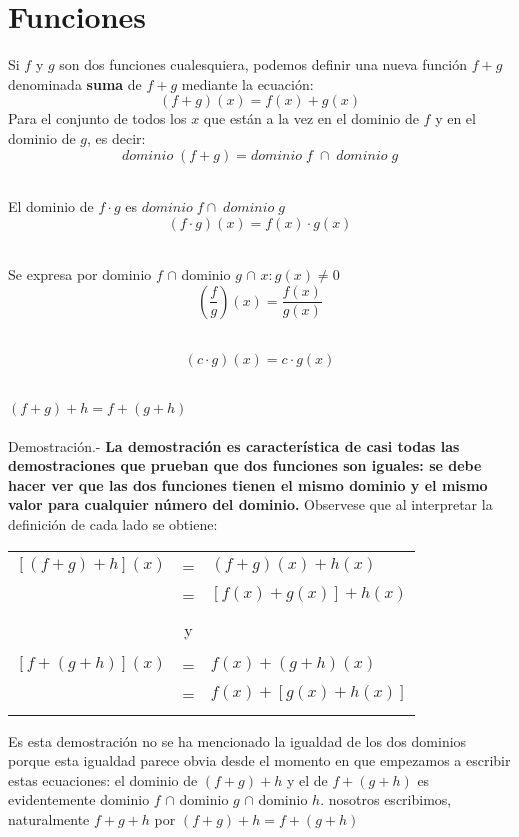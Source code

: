 \chapter{Funciones}
\begin{tcolorbox}
\begin{def.}
Si $f$ \; y \; $g$ son dos funciones cualesquiera, podemos definir una nueva función $f+g$ denominada \textbf{suma} de $f+g$ mediante la ecuación:
$$(f+g)(x)=f(x)+g(x)$$
Para el conjunto de todos los $x$ que están a la vez en el dominio de $f$ y en el dominio de $g$, es decir: $$dominio \; (f+g)=dominio \; f \; \cap \; dominio \; g$$\\
\end{def.}
\begin{def.}
El dominio de $f \cdot g$ es $dominio \; f \cap \; dominio \; g$ $$(f \cdot g)(x)=f(x)\cdot g(x)$$\\
\end{def.}
\begin{def.} Se expresa por dominio $f$ $\cap$ dominio $g$ $\cap$ ${x:g(x)\neq 0}$
$$\left( \dfrac{f}{g}\right) (x)=\dfrac{f(x)}{g(x)}$$ \\
\end{def.}
\begin{def.}
$$(c \cdot g)(x)=c \cdot g(x)$$\\
\end{def.}
\end{tcolorbox}

\begin{teo}
$(f+g)+h=f+(g+h)$\\\\
Demostración.- \; \textbf{La demostración es característica de casi todas las demostraciones que prueban que dos funciones son iguales: se debe hacer ver que las dos funciones tienen el mismo dominio y el mismo valor para cualquier número del dominio.} Observese que al interpretar la definición de cada lado se obtiene:
\begin{center}
\begin{tabular}{r c l}
$\left[ (f+g) + h \right](x)$&=&$(f+g)(x)+h(x)$\\
&=&$\left[ f(x) +g(x) \right] +h(x)$\\\\
&y&\\\\
$\left[ f+(g+h) \right](x)$&=&$f(x)+(g+h)(x)$\\
&=&$f(x)+\left[ g(x)+h(x) \right]$\\\\
\end{tabular}
\end{center}
Es esta demostración no se ha mencionado la igualdad de los dos dominios porque esta igualdad parece obvia desde el momento en que empezamos a escribir estas ecuaciones: el dominio de $(f+g)+h$ y el de $f+(g+h)$ es evidentemente dominio $f$ $\cap$ dominio $g$ $\cap$ dominio $h$. nosotros escribimos, naturalmente $f+g+h$ por $(f+g)+h=f+(g+h)$\\\\
\end{teo}


